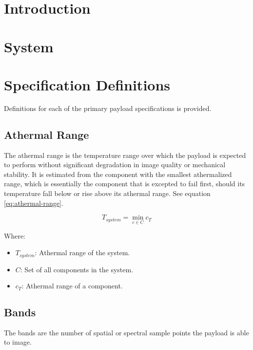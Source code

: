 \documentclass{article}
\begin{document}




\tableofcontents


\newpage

\section{Introduction}

\section{System}

\section{Specification Definitions}
Definitions for each of the primary payload specifications is provided.

\subsection{Athermal Range}
The athermal range is the temperature range over which the payload is expected to perform without significant degradation in image quality or mechanical stability. It is estimated from the component with the smallest athermalized range, which is essentially the component that is excepted to fail first, should its temperature fall below or rise above its athermal range. See equation \eqref{eq:athermal-range}.

\begin{equation} \label{eq:athermal-range}
    T_{system} = \min_{c \in C} c_{T}
\end{equation}

Where:
\begin{itemize}[label={}]
    \item $T_{system}$: Athermal range of the system.
    \item $C$: Set of all components in the system.
    \item $c_T$: Athermal range of a component.
\end{itemize}

\subsection{Bands}
The bands are the number of spatial or spectral sample points the payload is able to image. 
\end{document}
